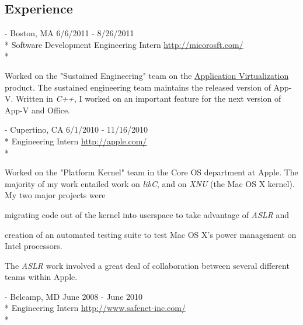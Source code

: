 \documentclass[a4paper,margin,line]{resume}
\newcommand{\rurl}[1]{\hfill {\footnotesize \url{#1}}}
\newcommand{\rdate}[1]{\hfill {\small #1}}
\renewcommand{\employer}[5]{\item[#1] - #2 \rdate{#3} \\* #4 \rurl{#5} \\*}
\begin{document}
\begin{resume}
\section{\mysidestyle Experience}
	\begin{asparadesc}
		\employer{Microsoft}{Boston, MA}{6/6/2011 - 8/26/2011}{Software Development Engineering Intern}{http://micorosft.com/}

		\small
		Worked on the "Sustained Engineering" team on the \href{http://www.microsoft.com/windows/enterprise/solutions/virtualization/products/app-v.aspx}{Application Virtualization} product. The sustained engineering team maintains the released version of App-V. Written in \emph{C++}, I worked on an important feature for the next version of App-V and Office.
		\normalsize
		\\
		\employer{Apple Inc}{Cupertino, CA}{6/1/2010 - 11/16/2010}{Engineering Intern}{http://apple.com/}

		\small
		Worked on the "Platform Kernel" team in the Core OS department at Apple. The majority of my work entailed work on \emph{libC}, and on \emph{XNU} (the Mac OS X kernel). My two major projects were \begin{inparaenum} \item migrating code out of the kernel into userspace to take advantage of \emph{ASLR} and \item creation of an automated testing suite to test Mac OS X's power management on Intel processors. \end{inparaenum} The \emph{ASLR} work involved a great deal of collaboration between several different teams within Apple.
		\normalsize
		\\
%
		\employer{SafeNet Inc}{Belcamp, MD}{June 2008 - June 2010}{Engineering Intern}{http://www.safenet-inc.com/}


\end{asparadesc}
\end{resume}
\end{document}
